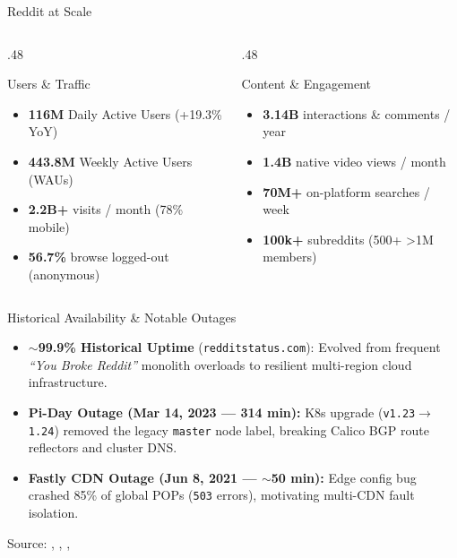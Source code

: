 \documentclass[
  aspectratio=169,
]{beamer}
\begin{document}
\begin{frame}{Reddit at Scale}
  \vspace{-3mm}
  \begin{columns}[T]
    \begin{column}{.48\textwidth}
      \begin{block}{Users \& Traffic}
        \footnotesize
        \begin{itemize}
          \item \textbf{116M} Daily Active Users (+19.3\% YoY)
          \item \textbf{443.8M} Weekly Active Users (WAUs)
          \item \textbf{2.2B+} visits / month (78\% mobile)
          \item \textbf{56.7\%} browse logged-out (anonymous)
        \end{itemize}
      \end{block}
    \end{column}
    \begin{column}{.48\textwidth}
      \begin{block}{Content \& Engagement}
        \footnotesize
      	\begin{itemize}
      		\item \textbf{3.14B} interactions \& comments / year
      		\item \textbf{1.4B} native video views / month
      		\item \textbf{70M+} on-platform searches / week
      		\item \textbf{100k+} subreddits (500+ >1M members)
      	\end{itemize}
      \end{block}
    \end{column}
  \end{columns}
  \vspace{0.5mm}
  \begin{alertblock}{Historical Availability \& Notable Outages}
    \footnotesize
    \begin{itemize}
      \item \textbf{$\sim$99.9\% Historical Uptime} (\texttt{redditstatus.com}): Evolved from frequent \emph{``You Broke Reddit''} monolith overloads to resilient multi-region cloud infrastructure.
      \item \textbf{Pi-Day Outage (Mar 14, 2023 — 314 min):} K8s upgrade (\texttt{v1.23}$\rightarrow$\texttt{1.24}) removed the legacy \texttt{master} node label, breaking Calico BGP route reflectors and cluster DNS.
      \item \textbf{Fastly CDN Outage (Jun 8, 2021 — $\sim$50 min):} Edge config bug crashed 85\% of global POPs (\texttt{503} errors), motivating multi-CDN fault isolation.
    \end{itemize}
  \end{alertblock}
  {\scriptsize Source: \cite{interteam2026reddit}, \cite{redditstatus2026}, \cite{redditeng2023piday}, \cite{fastly2021outage}}
\end{frame}
\end{document}
